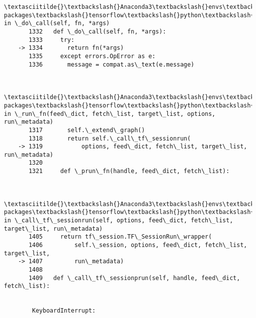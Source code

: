\documentclass[11pt]{article}
\begin{document}
\begin{Verbatim}[commandchars=\\\{\}]
        \textasciitilde{}\textbackslash{}Anaconda3\textbackslash{}envs\textbackslash{}keras2\textbackslash{}lib\textbackslash{}site-packages\textbackslash{}tensorflow\textbackslash{}python\textbackslash{}client\textbackslash{}session.py in \_do\_call(self, fn, *args)
       1332   def \_do\_call(self, fn, *args):
       1333     try:
    -> 1334       return fn(*args)
       1335     except errors.OpError as e:
       1336       message = compat.as\_text(e.message)
    

        \textasciitilde{}\textbackslash{}Anaconda3\textbackslash{}envs\textbackslash{}keras2\textbackslash{}lib\textbackslash{}site-packages\textbackslash{}tensorflow\textbackslash{}python\textbackslash{}client\textbackslash{}session.py in \_run\_fn(feed\_dict, fetch\_list, target\_list, options, run\_metadata)
       1317       self.\_extend\_graph()
       1318       return self.\_call\_tf\_sessionrun(
    -> 1319           options, feed\_dict, fetch\_list, target\_list, run\_metadata)
       1320 
       1321     def \_prun\_fn(handle, feed\_dict, fetch\_list):
    

        \textasciitilde{}\textbackslash{}Anaconda3\textbackslash{}envs\textbackslash{}keras2\textbackslash{}lib\textbackslash{}site-packages\textbackslash{}tensorflow\textbackslash{}python\textbackslash{}client\textbackslash{}session.py in \_call\_tf\_sessionrun(self, options, feed\_dict, fetch\_list, target\_list, run\_metadata)
       1405     return tf\_session.TF\_SessionRun\_wrapper(
       1406         self.\_session, options, feed\_dict, fetch\_list, target\_list,
    -> 1407         run\_metadata)
       1408 
       1409   def \_call\_tf\_sessionprun(self, handle, feed\_dict, fetch\_list):
    

        KeyboardInterrupt: 

    \end{Verbatim}

    \begin{center}
    \end{center}
    { \hspace*{\fill} \\}
    
    \begin{center}
    \end{center}
    { \hspace*{\fill} \\}
    
\end{document}
